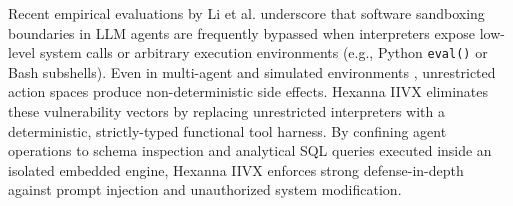 Recent empirical evaluations by Li et al. \cite{li2024evaluating} underscore that software sandboxing boundaries in LLM agents are frequently bypassed when interpreters expose low-level system calls or arbitrary execution environments (e.g., Python \texttt{eval()} or Bash subshells). Even in multi-agent and simulated environments \cite{park2023generative}, unrestricted action spaces produce non-deterministic side effects. Hexanna IIVX eliminates these vulnerability vectors by replacing unrestricted interpreters with a deterministic, strictly-typed functional tool harness. By confining agent operations to schema inspection and analytical SQL queries executed inside an isolated embedded engine, Hexanna IIVX enforces strong defense-in-depth against prompt injection and unauthorized system modification.
